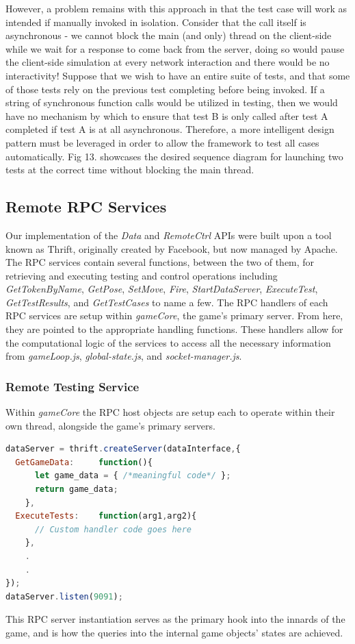 \documentclass[conference]{IEEEtran}
\begin{document}
However, a problem remains with this approach in that the test case will work as intended if manually invoked in isolation. Consider that the call itself is asynchronous - we cannot block the 
main (and only) thread on the client-side while we wait for a response to come back from the server, doing so would pause the client-side simulation at every network interaction and there would be no interactivity! 
Suppose that we wish to have an entire suite of tests, and that some of those tests rely on the previous test completing before being invoked. If a string of synchronous function calls would be utilized
in testing, then we would have no mechanism by which to ensure that test B is only called after test A completed if test A is at all asynchronous. Therefore, a more intelligent design pattern must 
be leveraged in order to allow the framework to test all cases automatically. Fig 13. showcases the desired sequence diagram for launching two tests at the correct time without blocking the main thread. 


\subsection{Remote RPC Services}
Our implementation of the \textit{Data} and \textit{RemoteCtrl} APIs were built upon a tool known as Thrift, originally created by Facebook, but now managed by Apache. The RPC services contain several functions, between the two of them, for retrieving and executing testing and control operations including \textit{GetTokenByName}, \textit{GetPose}, \textit{SetMove}, \textit{Fire}, \textit{StartDataServer}, \textit{ExecuteTest}, \textit{GetTestResults}, and \textit{GetTestCases} to name a few. The RPC handlers of each RPC services are setup within \textit{gameCore}, the game's primary server. From here, they are pointed to the appropriate handling functions. These handlers allow for the computational logic of the services to access all the necessary information from \textit{gameLoop.js}, \textit{global-state.js}, and \textit{socket-manager.js}.

\subsubsection{Remote Testing Service}
Within \textit{gameCore} the RPC host objects are setup each to operate within their own thread, alongside the game's primary servers.

\begin{lstlisting}[language=JavaScript,caption={In this example, the thrift is used to create a server for the  'dataInterface' service. It then lists two skeleton functions to handle 'GetGameData' and 'ExecuteTests' functions.}]
dataServer = thrift.createServer(dataInterface,{
  GetGameData:     function(){
      let game_data = { /*meaningful code*/ };
      return game_data;
    },
  ExecuteTests:    function(arg1,arg2){
      // Custom handler code goes here
    },
    .
    .
});
dataServer.listen(9091);
\end{lstlisting}
This RPC server instantiation serves as the primary hook into the innards of the game, and is how the queries into the internal game objects' states are achieved.
\end{document}
